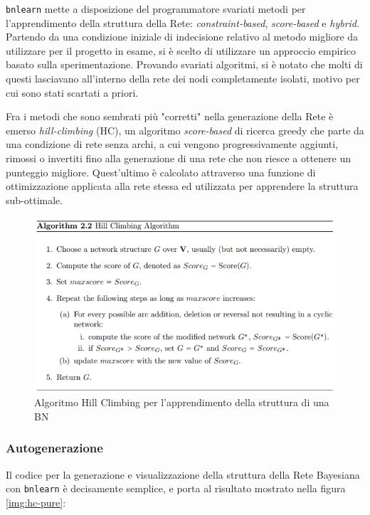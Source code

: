 \documentclass[hidelinks, 12pt]{article}
\begin{document}
\texttt{bnlearn} mette a disposizione del programmatore svariati metodi per l'apprendimento della struttura della Rete: \textit{constraint-based}, \textit{score-based} e \textit{hybrid}. Partendo da una condizione iniziale di indecisione relativo al metodo migliore da utilizzare per il progetto in esame, si è scelto di utilizzare un approccio empirico basato sulla sperimentazione. Provando svariati algoritmi, si è notato che molti di questi lasciavano all'interno della rete dei nodi completamente isolati, motivo per cui sono stati scartati a priori.

Fra i metodi che sono sembrati più "corretti" nella generazione della Rete è emerso \textit{hill-climbing} (HC), un algoritmo \textit{score-based} di ricerca greedy che parte da una condizione di rete senza archi, a cui vengono progressivamente aggiunti, rimossi o invertiti fino alla generazione di una rete che non riesce a ottenere un punteggio migliore. Quest'ultimo è calcolato attraverso una funzione di ottimizzazione applicata alla rete stessa ed utilizzata per apprendere la struttura sub-ottimale\cite{thesis:bnlearn-marco}.

\begin{figure}[H]
	\centering
	\includegraphics[scale=1]{images/05_00_hc_algo.png}
	\caption[Algoritmo Hill Climbing per l'apprendimento della struttura di una BN]{Algoritmo Hill Climbing per l'apprendimento della struttura di una BN}
	\label{img:hc-algorithm}
\end{figure}


\clearpage
\subsubsection{Autogenerazione}

Il codice per la generazione e visualizzazione della struttura della Rete Bayesiana con \texttt{bnlearn} è decisamente semplice, e porta al risultato mostrato nella figura \ref{img:hc-pure}:
\end{document}
